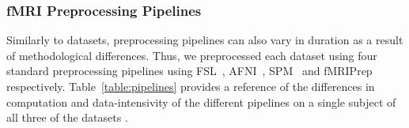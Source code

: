     \begin{table}[t]
      \small\centering
    \caption{Dataset characteristics }\label{table:data}
    \end{table}
    
    
    
    \subsubsection{fMRI Preprocessing Pipelines}
    
    Similarly to datasets, preprocessing pipelines can also vary in duration as a result of methodological differences.
    Thus, we preprocessed each dataset using four  standard preprocessing pipelines using FSL~\cite{fsl}, AFNI~\cite{AFNI},
    SPM~\cite{spm} and fMRIPrep~\cite{fmriprep} respectively. Table~\ref{table:pipelines} provides a reference of the differences in computation and data-intensivity
    of the different pipelines on a single subject of all three of the datasets .
    
